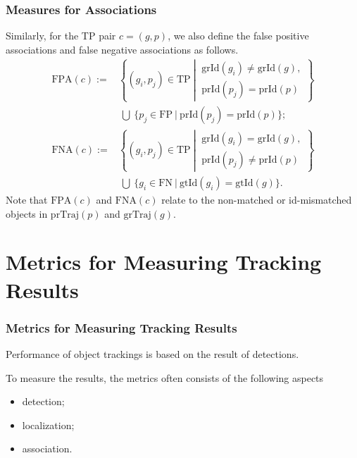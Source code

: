 \documentclass[slidetop, mathserif]{beamer}
\begin{document}
\begin{frame}
	\frametitle{Measures for Associations}
	
	Similarly, for the TP pair $c = (g, p)$, we also define the false positive associations
	and false negative associations as follows.
	\begin{align*}
		\text{FPA}(c) := &             
		\left\{(g_i, p_j)\in\text{TP}\ \left|\ 
		\begin{array}{c}
		\text{grId}(g_i) \neq \text{grId}(g), \\
		\text{prId}(p_j) = \text{prId}(p)
		\end{array}\right.
		\right\} \\
		                 & ~ \bigcup ~ 
		\Big\{p_j\in\text{FP}\ |\ 
		\text{prId}(p_j) = \text{prId}(p)
		\Big\}; \\
		\text{FNA}(c) := &             
		\left\{(g_i, p_j)\in\text{TP}\ \left|\ 
		\begin{array}{c}
		\text{grId}(g_i) = \text{grId}(g), \\
		\text{prId}(p_j) \neq \text{prId}(p)
		\end{array}\right.
		\right\} \\
		                 & ~ \bigcup ~ 
		\Big\{g_i\in\text{FN}\ |\ 
		\text{gtId}(g_i) = \text{gtId}(g)
		\Big\}.
	\end{align*}
	Note that $\text{FPA}(c)$ and $\text{FNA}(c)$ relate to the non-matched or id-mismatched
	objects in $\text{prTraj}(p)$ and $\text{grTraj}(g)$.
	
\end{frame}



\section{Metrics for Measuring Tracking Results}

\begin{frame}
	\frametitle{Metrics for Measuring Tracking Results}
	
	Performance of object trackings is based on the result of detections.
	
	\quad 
	
	To measure the results, the metrics often consists of the following aspects
	\begin{itemize}
		\item detection;%
		\item localization;%
		\item association.%
	\end{itemize}
	    
\end{frame}
\end{document}
